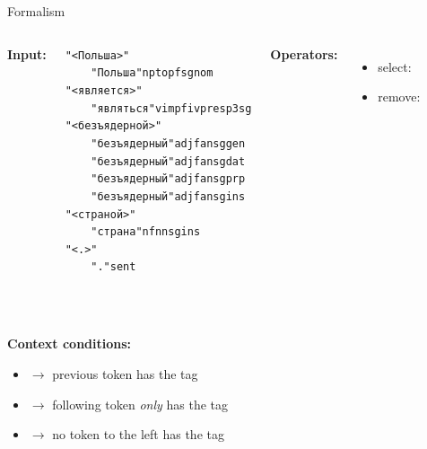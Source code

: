 \documentclass{beamer}
\begin{document}
\begin{frame}{Formalism}

\begin{columns}
   \textbf{Input:}
\begin{tiny}
\begin{alltt}
"<Польша>"\\
~~~~"Польша" np top f sg nom\\
"<является>"\\
~~~~"являться" v impf iv pres p3 sg\\
"<безъядерной>"\\
~~~~"безъядерный" adj f an sg gen\\
~~~~"безъядерный" adj f an sg dat\\
~~~~"безъядерный" adj f an sg prp\\
~~~~"безъядерный" adj f an sg ins\\
"<страной>"\\
~~~~"страна" n f nn sg ins\\
"<.>"\\
~~~~"." sent\\
\end{alltt}
\end{tiny}

   \textbf{Operators:}
     \begin{itemize}
       \item {\sc select}: 
       \item {\sc remove}: 
     \end{itemize}
\end{columns}

~\\
~\\
\noindent
   \textbf{Context conditions:}
     \begin{itemize}
       \item {} $\rightarrow$ previous token has the tag  
       \item {} $\rightarrow$ following token \emph{only} has the tag 
       \item {} $\rightarrow$ no token to the left has the tag 
     \end{itemize}


\end{frame}
\end{document}
